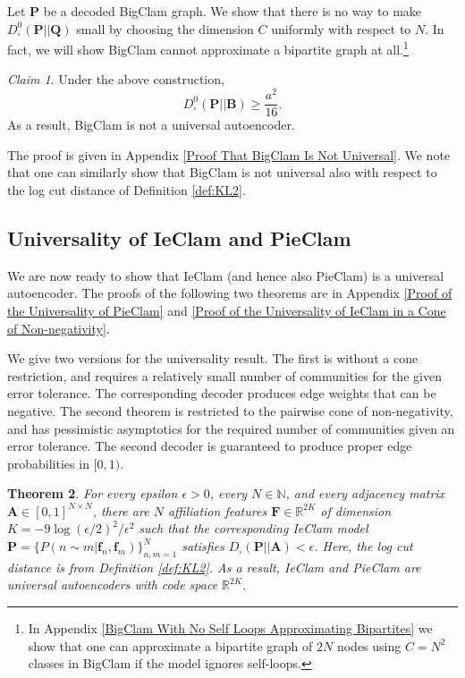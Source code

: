 \documentclass{article}
\theoremstyle{plain}
\newtheorem{theorem}{Theorem}[section]
\theoremstyle{definition}
\theoremstyle{remark}
\newtheorem{claim}[theorem]{Claim}
\begin{document}
Let $\mathbf{P}$ be a decoded BigClam graph. 
We show that there is no way to make $D^0_{\square}(\mathbf{P} || \mathbf{Q})$ small by choosing the dimension $C$ uniformly with respect to $N$. In fact, we will show BigClam cannot approximate a bipartite graph at all.\footnote{In Appendix \ref{BigClam With No Self Loops Approximating Bipartites} we show that one can approximate a bipartite graph of $2N$ nodes using $C=N^2$ classes in BigClam if the model ignores self-loops.} 

\begin{claim}
\label{claim:Clam_bi}
    Under the above construction, 
    \[D^0_{\square}(\mathbf{P} || \mathbf{B}) \geq \frac{a^2}{16}.\]
    As a result, BigClam is not a universal autoencoder.
\end{claim}
The proof is given in Appendix \ref{Proof That BigClam Is Not Universal}.
We note that one can similarly show that BigClam is not universal also with respect to the log cut distance of Definition \ref{def:KL2}.


\subsection{Universality of IeClam and PieClam}
We are now ready to show that IeClam (and hence also PieClam) is a universal autoencoder. The proofs of the following two theorems are in Appendix \ref{Proof of the Universality of PieClam} and \ref{Proof of the Universality of IeClam in a Cone of Non-negativity}.

We give two versions for the universality result. The first is without a cone restriction, and requires a relatively small number of communities for the given error tolerance. The corresponding decoder produces edge weights that can be negative. The second theorem is restricted to the pairwise cone of non-negativity, and has pessimistic  asymptotics for the required number of communities given an error tolerance. The second decoder is guaranteed to produce proper edge probabilities in $[0,1)$.



\begin{theorem}
\label{thm:IEUniversality}
    For every epsilon $\epsilon>0$, every $N\in\mathbb{N}$, and every adjacency matrix $\mathbf{A}\in[0,1]^{N\times N}$, there are $N$ affiliation features $\mathbf{F}\in \mathbb{R}^{2K}$ of dimension  $K=-9\log(\epsilon/2)^2/\epsilon^2$ such that the corresponding IeClam model $\mathbf{P}=\{P(n\sim m|\mathbf{f}_n, \mathbf{f}_m)\}_{n,m=1}^N$ satisfies 
     $D_{\square}(\mathbf{P} || \mathbf{A}) <\epsilon$.  
    Here, the log cut distance is from Definition \ref{def:KL2}.
    As a result, 
    IeClam and PieClam are universal autoencoders with code space $\mathbb{R}^{2K}$.
\end{theorem}
\end{document}
